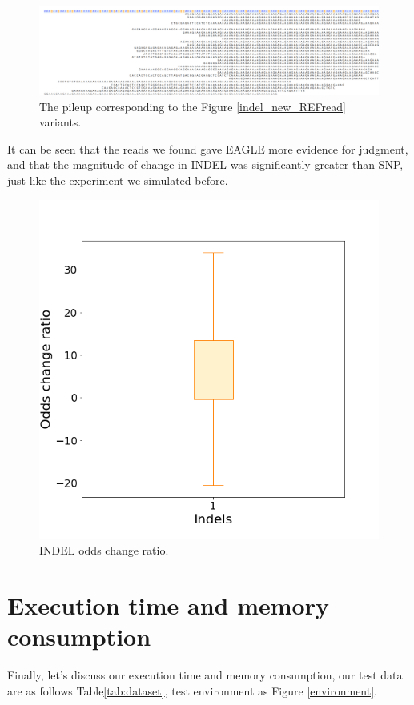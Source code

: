 \begin{figure}[H]
\centering
\includegraphics[width=1\columnwidth]{body/image/indel_pileup_REFread.png}
\caption[Figure 4.24 pileup]{The pileup corresponding to the Figure \ref{indel_new_REFread} variants.}
\label{indel_pileup_REFread}
\end{figure}

It can be seen that the reads we found gave EAGLE more evidence for judgment, and that the magnitude of change in INDEL was significantly greater than SNP, just like the experiment we simulated before.

\begin{figure}[H]
\centering
\includegraphics[width=0.6\columnwidth]{body/image/indel_odds_change.png}
\caption[INDEL odds change ratio]{INDEL odds change ratio.}
\label{indel_odds_change}
\end{figure}

\section{Execution time and memory consumption}

Finally, let’s discuss our execution time and memory consumption, our test data are as follows Table\ref{tab:dataset}, test environment as Figure \ref{environment}.

